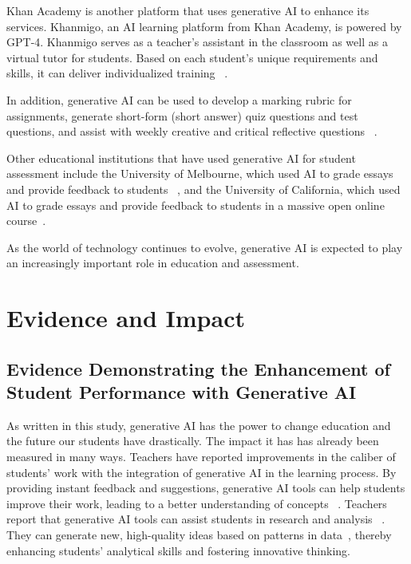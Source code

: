 \documentclass[a4paper,12pt]{report}
\begin{document}
Khan Academy is another platform that uses generative AI to enhance its services. Khanmigo, an AI learning platform from Khan Academy, is powered by GPT-4. Khanmigo serves as a teacher’s assistant in the classroom as well as a virtual tutor for students. Based on each student’s unique requirements and skills, it can deliver individualized training ~\cite{assessment-use-cases}.

In addition, generative AI can be used to develop a marking rubric for assignments, generate short-form (short answer) quiz questions and test questions, and assist with weekly creative and critical reflective questions  ~\cite{English-test}.

Other educational institutions that have used generative AI for student assessment include the University of Melbourne, which used AI to grade essays and provide feedback to students ~\cite{holmes2023guidance}, and the University of California, which used AI to grade essays and provide feedback to students in a massive open online course~\cite{assessment-use-cases}.

As the world of technology continues to evolve, generative AI is expected to play an increasingly important role in education and assessment.

\newpage

\chapter{Evidence and Impact} \label{chap:evidence}
\newpage
\section{Evidence Demonstrating the Enhancement of Student Performance with Generative AI} \label{sect:evidence}
\hspace{10mm} As written in this study, generative AI has the power to change education and the future our students have drastically. The impact it has has already been measured in many ways. Teachers have reported improvements in the caliber of students’ work with the integration of generative AI in the learning process. By providing instant feedback and suggestions, generative AI tools can help students improve their work, leading to a better understanding of concepts ~\cite{digitaltreasury}. Teachers report that generative AI tools can assist students in research and analysis ~\cite{chan2023students}. They can generate new, high-quality ideas based on patterns in data~\cite{keyhani2023student}, thereby enhancing students’ analytical skills and fostering innovative thinking.
\end{document}
